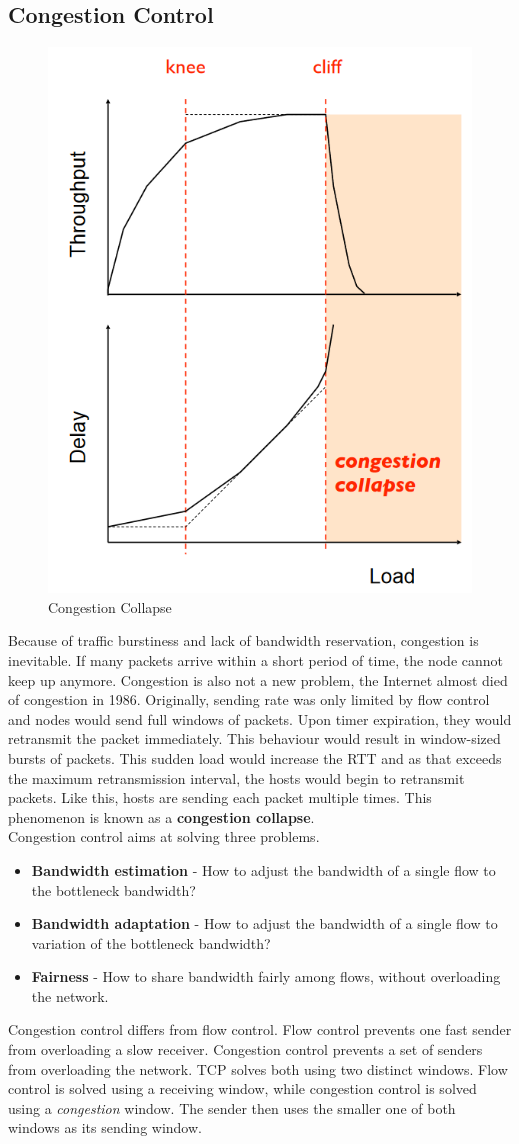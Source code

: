 \subsection{Congestion Control}
\begin{figure}
\centering
\includegraphics[width=.4\textwidth]{images/congestion_collapse.PNG}
\caption{Congestion Collapse}
\label{congestion_collapse}
\end{figure}
Because of traffic burstiness and lack of bandwidth reservation, congestion is inevitable. If many packets arrive within a short period of time, the node cannot keep up anymore. Congestion is also not a new problem, the Internet almost died of congestion in 1986. Originally, sending rate was only limited by flow control and nodes would send full windows of packets. Upon timer expiration, they would retransmit the packet immediately. This behaviour would result in window-sized bursts of packets. This sudden load would increase the RTT and as that exceeds the maximum retransmission interval, the hosts would begin to retransmit packets. Like this, hosts are sending each packet multiple times. This phenomenon is known as a \textbf{congestion collapse}. \vspace{.3cm}\\
Congestion control aims at solving three problems.
\begin{itemize}
\item \textbf{Bandwidth estimation} - How to adjust the bandwidth of a single flow to the bottleneck bandwidth?
\item \textbf{Bandwidth adaptation} - How to adjust the bandwidth of a single flow to variation of the bottleneck bandwidth?
\item \textbf{Fairness} - How to share bandwidth fairly among flows, without overloading the network.
\end{itemize}
Congestion control differs from flow control. Flow control prevents one fast sender from overloading a slow receiver. Congestion control prevents a set of senders from overloading the network. TCP solves both using two distinct windows. Flow control is solved using a receiving window, while congestion control is solved using a \textit{congestion} window. The sender then uses the smaller one of both windows as its sending window.


